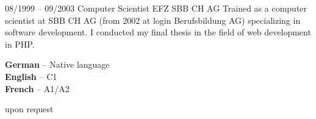 \documentclass[10pt]{../developercv} %
\begin{document}

\vspace{0.5cm} %

\begin{entrylist}
	\entry
	{\footnotesize 08/1999 -- 09/2003}
	{Computer Scientist EFZ}
	{SBB CH AG}
	{Trained as a computer scientist at SBB CH AG (from 2002 at login Berufsbildung AG) specializing in software development. I conducted my final thesis in the field of web development in PHP.}
\end{entrylist}


\vspace{0.5cm} %
\begin{minipage}[t]{0.45\textwidth} %
	\vspace{-\baselineskip} %


	\textbf{German} -- Native language\\
	\textbf{English} -- C1\\
	\textbf{French} -- A1/A2
\end{minipage}
\hfill %
\begin{minipage}[t]{0.45\textwidth} %
	\vspace{-\baselineskip} %


	upon request
\end{minipage}

\end{document}
